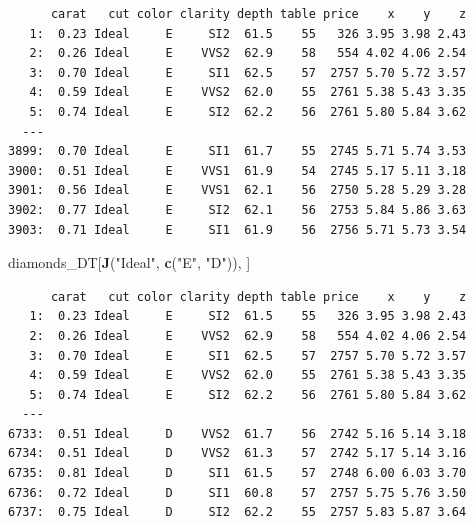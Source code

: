 \documentclass[
]{book}
\newenvironment{Shaded}{\begin{snugshade}}{\end{snugshade}}
\newcommand{\CommentTok}[1]{\textcolor[rgb]{0.56,0.35,0.01}{\textit{#1}}}
\newcommand{\KeywordTok}[1]{\textcolor[rgb]{0.13,0.29,0.53}{\textbf{#1}}}
\newcommand{\NormalTok}[1]{#1}
\newcommand{\OperatorTok}[1]{\textcolor[rgb]{0.81,0.36,0.00}{\textbf{#1}}}
\newcommand{\StringTok}[1]{\textcolor[rgb]{0.31,0.60,0.02}{#1}}
\begin{document}
\begin{verbatim}
      carat   cut color clarity depth table price    x    y    z
   1:  0.23 Ideal     E     SI2  61.5    55   326 3.95 3.98 2.43
   2:  0.26 Ideal     E    VVS2  62.9    58   554 4.02 4.06 2.54
   3:  0.70 Ideal     E     SI1  62.5    57  2757 5.70 5.72 3.57
   4:  0.59 Ideal     E    VVS2  62.0    55  2761 5.38 5.43 3.35
   5:  0.74 Ideal     E     SI2  62.2    56  2761 5.80 5.84 3.62
  ---                                                           
3899:  0.70 Ideal     E     SI1  61.7    55  2745 5.71 5.74 3.53
3900:  0.51 Ideal     E    VVS1  61.9    54  2745 5.17 5.11 3.18
3901:  0.56 Ideal     E    VVS1  62.1    56  2750 5.28 5.29 3.28
3902:  0.77 Ideal     E     SI2  62.1    56  2753 5.84 5.86 3.63
3903:  0.71 Ideal     E     SI1  61.9    56  2756 5.71 5.73 3.54
\end{verbatim}

\begin{Shaded}
\begin{Highlighting}[]
\NormalTok{diamonds_DT[}\KeywordTok{J}\NormalTok{(}\StringTok{"Ideal"}\NormalTok{, }\KeywordTok{c}\NormalTok{(}\StringTok{"E"}\NormalTok{, }\StringTok{"D"}\NormalTok{)), ]}
\end{Highlighting}
\end{Shaded}

\begin{verbatim}
      carat   cut color clarity depth table price    x    y    z
   1:  0.23 Ideal     E     SI2  61.5    55   326 3.95 3.98 2.43
   2:  0.26 Ideal     E    VVS2  62.9    58   554 4.02 4.06 2.54
   3:  0.70 Ideal     E     SI1  62.5    57  2757 5.70 5.72 3.57
   4:  0.59 Ideal     E    VVS2  62.0    55  2761 5.38 5.43 3.35
   5:  0.74 Ideal     E     SI2  62.2    56  2761 5.80 5.84 3.62
  ---                                                           
6733:  0.51 Ideal     D    VVS2  61.7    56  2742 5.16 5.14 3.18
6734:  0.51 Ideal     D    VVS2  61.3    57  2742 5.17 5.14 3.16
6735:  0.81 Ideal     D     SI1  61.5    57  2748 6.00 6.03 3.70
6736:  0.72 Ideal     D     SI1  60.8    57  2757 5.75 5.76 3.50
6737:  0.75 Ideal     D     SI2  62.2    55  2757 5.83 5.87 3.64
\end{verbatim}

\begin{Shaded}
\end{Shaded}
\end{document}
